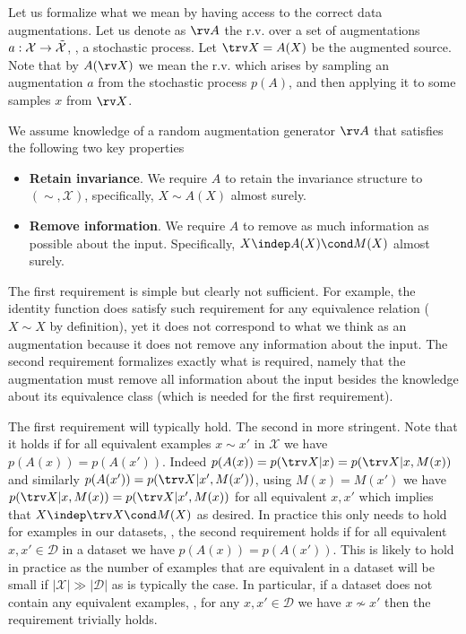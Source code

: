 \documentclass[final]{article}
\begin{document}
Let us formalize what we mean by having access to the correct data augmentations.
Let us denote as $\rv A$ the r.v. over a set of augmentations $a : \mathcal{X} \to \Tilde{\mathcal{X}}$, \ie, a stochastic process.
Let $\trv X = A(X)$ be the augmented source.
Note that by $A(\rv X)$ we mean the r.v. which arises by sampling an augmentation $a$ from the stochastic process $p(A)$, and then applying it to some samples $x$ from $\rv X$.
\begin{assumption}[Augmentations]\label{assumption:augmentations}
We assume knowledge of a random augmentation generator $\rv A$ that satisfies the following two key properties
\begin{itemize}
\item \textbf{Retain invariance}. We require $A$ to retain the invariance structure to $(\sim,\mathcal{X})$, specifically, $X \sim A(X)$ almost surely.
\item \textbf{Remove information}. We require $A$ to remove as much information as possible about the input. 
Specifically, $X \indep A(X) \cond M(X) $ almost surely.
\end{itemize}
\end{assumption}
The first requirement is simple but clearly not sufficient.
For example, the identity function does satisfy such requirement for any equivalence relation ($X \sim X$ by definition), yet it does not correspond to what we think as an augmentation because it does not remove any information about the input.
The second requirement formalizes exactly what is required, namely that the augmentation must remove all information about the input besides the knowledge about its equivalence class (which is needed for the first requirement).


The first requirement will typically hold. 
The second in more stringent.
Note that it holds if for all equivalent examples $x\sim x'$ in $\mathcal{X}$ we have $p(A(x)) = p(A(x'))$.
Indeed $p(A(x)) =p(\trv X|x) =p(\trv X|x,M(x))$ and similarly $p(A(x')) =p(\trv X|x',M(x'))$, using $M(x)=M(x')$ we have $p(\trv X|x,M(x)) =p(\trv X|x',M(x))$ for all equivalent $x,x'$ which implies that $X \indep \trv X \cond M(X) $ as desired.
In practice this only needs to hold for examples in our datasets, \ie, the second requirement holds if for all equivalent $x,x' \in \mathcal{D}$ in a dataset we have $p(A(x)) = p(A(x'))$.
This is likely to hold in practice as the number of examples that are equivalent in a dataset will be small if $|\mathcal{X}| \gg |\mathcal{D}|$ as is typically the case.
In particular, if a dataset does not contain any equivalent examples, \ie, for any $x,x' \in \mathcal{D}$ we have $x \not\sim x'$ then the requirement trivially holds.
\end{document}
